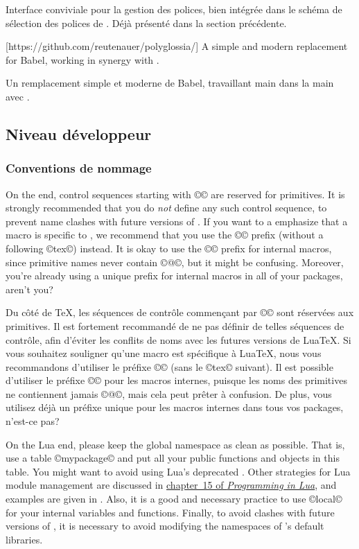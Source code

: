 \documentclass{lltxdoc}
\begin{document}
Interface conviviale pour la gestion des polices, bien intégrée dans le schéma de sélection des polices de \latex. Déjà présenté dans la section précédente.

[https://github.com/reutenauer/polyglossia/]
A simple and modern replacement for Babel, working in synergy with .

Un remplacement simple et moderne de Babel, travaillant main dans la main avec .

\subsection{Niveau développeur}

\subsubsection{Conventions de nommage}

On the \tex end, control sequences starting with ©\luatex© are reserved for
primitives. It is strongly recommended that you do \emph{not} define any such
control sequence, to prevent name clashes with future versions of \luatex. If
you want to a emphasize that a macro is specific to \luatex, we recommend that
you use the ©\lua© prefix (without a following ©tex©) instead. It is okay to
use the ©\luatex@© prefix for internal macros, since primitive names never
contain ©@©, but it might be confusing. Moreover, you're already using a
unique prefix for internal macros in all of your packages, aren't you?

Du côté de TeX, les séquences de contrôle commençant par ©\luatex© sont réservées aux primitives. Il est fortement recommandé de ne pas définir de telles séquences de contrôle, afin d'éviter les conflits de noms avec les futures versions de LuaTeX. Si vous souhaitez souligner qu'une macro est spécifique à LuaTeX, nous vous recommandons d'utiliser le préfixe ©\lua© (sans le ©tex© suivant). Il est possible d'utiliser le préfixe ©\luatex@© pour les macros internes, puisque les noms des primitives ne contiennent jamais ©@©, mais cela peut prêter à confusion. De plus, vous utilisez déjà un préfixe unique pour les macros internes dans tous vos packages, n'est-ce pas?

On the Lua end, please keep the global namespace as clean as possible. That
is, use a table ©mypackage© and put all your public functions and objects in
this table. You might want to avoid using Lua's deprecated .
Other strategies for Lua module management are discussed in
\href{http://www.lua.org/pil/15.html}{chapter~15 of \emph{Programming in
Lua}}, and examples are given in . Also, it
is a good and necessary practice to use ©local© for your internal variables and
functions. Finally, to avoid clashes with future versions of \luatex, it is
necessary to avoid modifying the namespaces of \luatex's default libraries.
\end{document}
